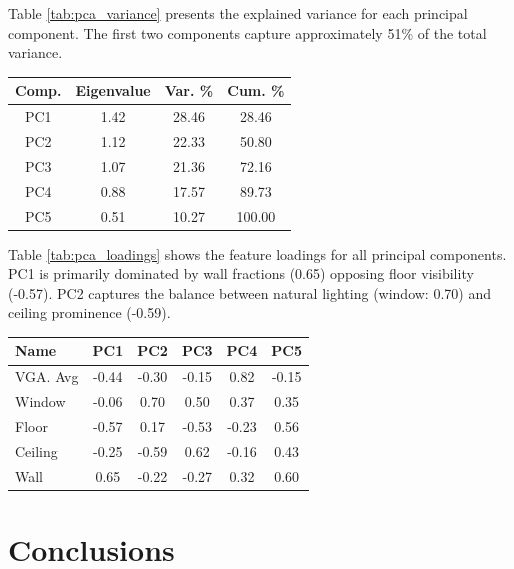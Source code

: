 \documentclass[11pt,a4paper]{article}
\begin{document}
\begin{multicols}{2}
Table \ref{tab:pca_variance} presents the explained variance for each principal component. The first two 
components capture approximately 51\% of the total variance.
\begin{center}
\begin{tabular}{c|c|c|c}
\hline
Comp. & Eigenvalue & Var. \% & Cum. \% \\
\hline
PC1 & 1.42 & 28.46 & 28.46 \\
PC2 & 1.12 & 22.33 & 50.80 \\
PC3 & 1.07 & 21.36 & 72.16 \\
PC4 & 0.88 & 17.57 & 89.73 \\
PC5 & 0.51 & 10.27 & 100.00 \\
\hline
\end{tabular}
\label{tab:pca_variance}
\end{center}
Table \ref{tab:pca_loadings} shows the feature loadings for all principal components. PC1 is primarily 
dominated by wall fractions (0.65) opposing floor visibility (-0.57). PC2 captures the balance between natural lighting (window: 0.70) 
and ceiling prominence (-0.59).

\begin{center}
\begin{tabular}{l|c|c|c|c|c}
\hline
Name & PC1 & PC2 & PC3 & PC4 & PC5 \\
\hline
VGA. Avg & -0.44 & -0.30 & -0.15 & 0.82 & -0.15 \\
Window & -0.06 & 0.70 & 0.50 & 0.37 & 0.35 \\
Floor & -0.57 & 0.17 & -0.53 & -0.23 & 0.56 \\
Ceiling & -0.25 & -0.59 & 0.62 & -0.16 & 0.43 \\
Wall & 0.65 & -0.22 & -0.27 & 0.32 & 0.60 \\
\hline
\end{tabular}
\label{tab:pca_loadings}
\end{center}


\vspace{1em}

\section{Conclusions}


\end{multicols}
\end{document}
